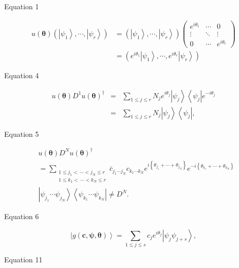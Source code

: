 \documentclass{article}
\begin{document}
Equation 1

\begin{align*}
u\left( \boldsymbol{\theta }\right) \left( \left\vert \psi _{1}\right\rangle
,\cdots ,\left\vert \psi _{r}\right\rangle \right) & =\left( \left\vert \psi
_{1}\right\rangle ,\cdots ,\left\vert \psi _{r}\right\rangle \right) \left( 
\begin{array}{ccc}
e^{i\theta _{1}} & \cdots  & 0 \\ 
\vdots  & \ddots  & \vdots  \\ 
0 & \cdots  & e^{i\theta _{r}}%
\end{array}%
\right)  \\
& =\left( e^{i\theta _{1}}\left\vert \psi _{1}\right\rangle ,\cdots
,e^{i\theta _{r}}\left\vert \psi _{r}\right\rangle \right) 
\end{align*}

Equation 4

\begin{eqnarray*}
u\left( \boldsymbol{\theta }\right) D^{1}u\left( \boldsymbol{\theta }\right)
^{\dagger } &=&\sum_{1\leq j\leq r}N_{j}e^{i\theta _{j}}\left\vert \psi
_{j}\right\rangle \left\langle \psi _{j}\right\vert e^{-i\theta _{j}} \\
&=&\sum_{1\leq j\leq r}N_{j}\left\vert \psi _{j}\right\rangle \left\langle
\psi _{j}\right\vert ,
\end{eqnarray*}

Equation 5

\begin{align*}
& u\left( \boldsymbol{\theta }\right) D^{N}u\left( \boldsymbol{\theta }%
\right) ^{\dagger } \\
& =\sum_{\substack{ 1\leq j_{1}<\,\cdots <j_{N}\leq r \\ 1\leq
k_{1}<\,\cdots <k_{N}\leq r}}\bar{c}_{j_{1}\cdots j_{N}}c_{k_{1}\cdots
k_{N}}e^{i\left\{ \theta _{j_{1}}+\cdots +\theta _{j_{N}}\right\}
}e^{-i\left\{ \theta _{k_{1}}+\cdots +\theta _{k_{N}}\right\} } \\
& \left\vert \psi _{j_{1}}\cdots \psi _{j_{N}}\right\rangle \left\langle
\psi _{k_{1}}\cdots \psi _{k_{N}}\right\vert \neq D^{N}.
\end{align*}

Equation 6

\[
\left\vert g\left( \boldsymbol{c},\boldsymbol{\psi },\boldsymbol{\theta }%
\right) \right\rangle =\sum_{1\leq j\leq s}c_{j}e^{i\theta _{j}}\left\vert
\psi _{j}\psi _{j+s}\right\rangle ,
\]

Equation 11
\end{document}
